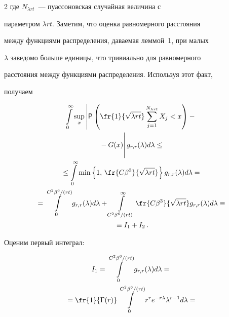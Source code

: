 \begin{multicols}{2}
где $N_{\lambda rt}$~--- пуассоновская случайная величина с


параметром $\lambda rt$. Заметим, что оценка равномерного расстояния


между функциями распределения, даваемая леммой~1, при малых


$\lambda$ заведомо больше единицы, что тривиально для равномерного


расстояния между функциями распределения. Используя этот факт,


получаем


\begin{multline*}


\int\limits_0^{\infty}\sup\limits_x \left\vert{\sf P}\left(\fr{1}{\sqrt{\lambda


rt}}\sum\limits_{j=1}^{N_{\lambda rt}}X_j<x


\right)-{}\right.\\


\left.{}-G(x)\vphantom{\sum\limits_{j=1}^N}\right\vert g_{r,r}(\lambda)d\lambda\le{}\\


{}\le


\int\limits_0^{\infty} \min\left\{1,\, \fr{C\beta^3}{\sqrt{\lambda


r t}}\right\} g_{r,r}(\lambda) d\lambda={}


\\


{}=\int\limits_0^{C^2\beta^6/(rt)}g_{r,r}(\lambda)


d\lambda+\int\limits_{C^2\beta^6/(rt)}^{\infty}\fr{C\beta^3}{\sqrt{\lambda


r t}} g_{r,r}(\lambda) d\lambda \equiv{}\\


{}\equiv I_1+I_2\,.


\end{multline*}


Оценим первый интеграл:


\begin{multline*}


I_1 =\int\limits_0^{C^2\beta^6/(rt)}g_{r,r}(\lambda)


d\lambda={}\\


{}=\fr{1}{\Gamma(r)}\int\limits_0^{C^2\beta^6/(rt)}r^r


e^{-r\lambda} \lambda^{r-1}d\lambda={}


\\



\end{multline*}
\end{multicols}
